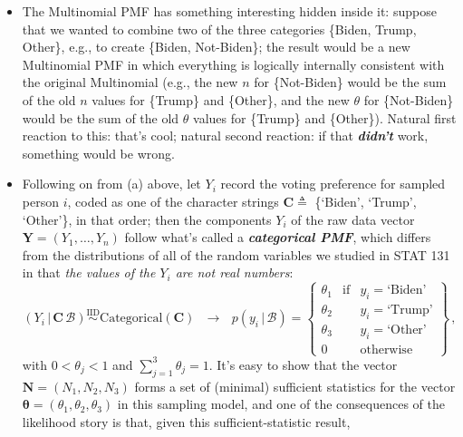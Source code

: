 \documentclass[12pt]{article}
\newcommand{\given}{\, | \,}
\newcommand{\bi}[1]{\textbf{\textit{#1}}}
\begin{document}
\begin{itemize}

\item

The Multinomial PMF has something interesting hidden inside it: suppose that we wanted to combine two of the three categories \{Biden, Trump, Other\}, e.g., to create \{Biden, Not-Biden\}; the result would be a new Multinomial PMF in which everything is logically internally consistent with the original Multinomial (e.g., the new $n$ for \{Not-Biden\} would be the sum of the old $n$ values for \{Trump\} and \{Other\}, and the new $\theta$ for \{Not-Biden\} would be the sum of the old $\theta$ values for \{Trump\} and \{Other\}). Natural first reaction to this: that's cool; natural second reaction: if that \bi{didn't} work, something would be wrong.

\item

Following on from (a) above, let $Y_i$ record the voting preference for sampled person $i$, coded as one of the character strings $\bm{ C } \triangleq $ \{`Biden', `Trump', `Other'\}, in that order; then the components $Y_i$ of the raw data vector $\bm{ Y } = ( Y_1, \dots, Y_n )$ follow what's called a \bi{categorical PMF}, which differs from the distributions of all of the random variables we studied in STAT 131 in that \textit{the values of the $Y_i$ are not real numbers}:
\begin{equation} \label{e:categorical-1}
( Y_i \given \bm{ C } \, \mathcal{ B } ) \stackrel{ \textrm{IID} }{ \sim }\textrm{Categorical} ( \bm{ C } ) \ \ \ \rightarrow \ \ \ p ( y_i \given \mathcal{ B } ) = \left\{ \begin{array}{ccc} \theta_1 & \textrm{if} & y_i = \textrm{`Biden'} \\ \theta_2 & & y_i = \textrm{`Trump'} \\ \theta_3 & & y_i = \textrm{`Other'} \\ 0 & & \textrm{otherwise} \end{array} \right\} \, ,
\end{equation}
with $0 < \theta_j < 1$ and $\sum_{ j = 1 }^3 \theta_j = 1$. It's easy to show that the vector $\bm{ N } = ( N_1, N_2, N_3 )$ forms a set of (minimal) sufficient statistics for the vector $\bm{ \theta } = ( \theta_1, \theta_2, \theta_3 )$ in this sampling model, and one of the consequences of the likelihood story is that, given this sufficient-statistic result, 

\begin{quote}


\end{quote}
\end{itemize}
\end{document}
